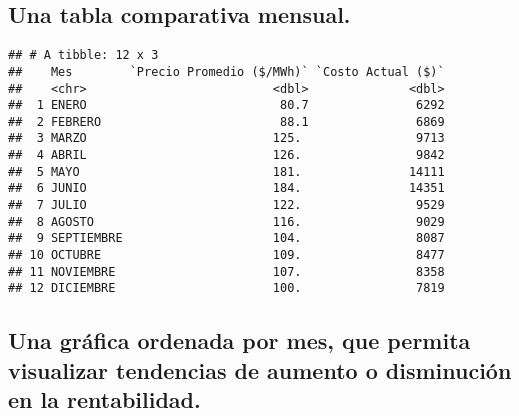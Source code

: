 \documentclass[
]{article}
\newenvironment{Shaded}{\begin{snugshade}}{\end{snugshade}}
\newcommand{\AttributeTok}[1]{\textcolor[rgb]{0.13,0.29,0.53}{#1}}
\newcommand{\DecValTok}[1]{\textcolor[rgb]{0.00,0.00,0.81}{#1}}
\newcommand{\FunctionTok}[1]{\textcolor[rgb]{0.13,0.29,0.53}{\textbf{#1}}}
\newcommand{\NormalTok}[1]{#1}
\newcommand{\OtherTok}[1]{\textcolor[rgb]{0.56,0.35,0.01}{#1}}
\newcommand{\SpecialCharTok}[1]{\textcolor[rgb]{0.81,0.36,0.00}{\textbf{#1}}}
\newcommand{\StringTok}[1]{\textcolor[rgb]{0.31,0.60,0.02}{#1}}
\begin{document}
\subsection{Una tabla comparativa
mensual.}\label{una-tabla-comparativa-mensual.}

\begin{Shaded}
\end{Shaded}

\begin{verbatim}
## # A tibble: 12 x 3
##    Mes        `Precio Promedio ($/MWh)` `Costo Actual ($)`
##    <chr>                          <dbl>              <dbl>
##  1 ENERO                           80.7               6292
##  2 FEBRERO                         88.1               6869
##  3 MARZO                          125.                9713
##  4 ABRIL                          126.                9842
##  5 MAYO                           181.               14111
##  6 JUNIO                          184.               14351
##  7 JULIO                          122.                9529
##  8 AGOSTO                         116.                9029
##  9 SEPTIEMBRE                     104.                8087
## 10 OCTUBRE                        109.                8477
## 11 NOVIEMBRE                      107.                8358
## 12 DICIEMBRE                      100.                7819
\end{verbatim}

\subsection{Una gráfica ordenada por mes, que permita visualizar
tendencias de aumento o disminución en la
rentabilidad.}\label{una-gruxe1fica-ordenada-por-mes-que-permita-visualizar-tendencias-de-aumento-o-disminuciuxf3n-en-la-rentabilidad.}
\end{document}
